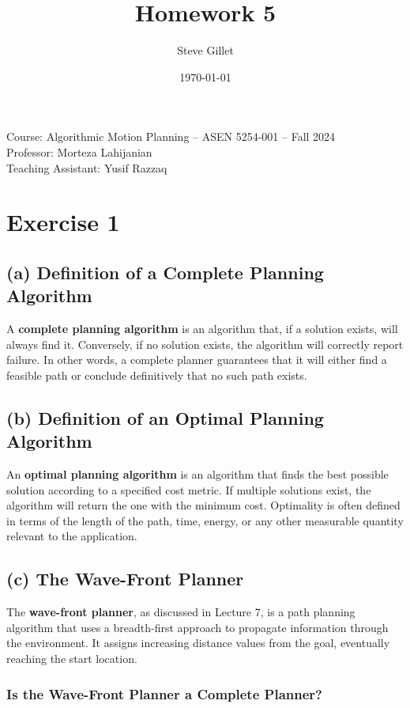 \documentclass{article}
\title{Homework 5}
\author{Steve Gillet}
\date{\today}
\newcommand{\className}{Course: Algorithmic Motion Planning – ASEN 5254-001 – Fall 2024}
\newcommand{\professorName}{Professor: Morteza Lahijanian}
\newcommand{\taName}{Teaching Assistant: Yusif Razzaq}
\begin{document}
\maketitle
\begin{center}
    \large{\className} \\
    \large{\professorName} \\
    \large{\taName}
\end{center}

\section{Exercise 1}

\subsection*{(a) Definition of a Complete Planning Algorithm}

A \textbf{complete planning algorithm} is an algorithm that, if a solution exists, will always find it. Conversely, if no solution exists, the algorithm will correctly report failure. In other words, a complete planner guarantees that it will either find a feasible path or conclude definitively that no such path exists.

\subsection*{(b) Definition of an Optimal Planning Algorithm}

An \textbf{optimal planning algorithm} is an algorithm that finds the best possible solution according to a specified cost metric. If multiple solutions exist, the algorithm will return the one with the minimum cost. Optimality is often defined in terms of the length of the path, time, energy, or any other measurable quantity relevant to the application.

\subsection*{(c) The Wave-Front Planner}

The \textbf{wave-front planner}, as discussed in Lecture 7, is a path planning algorithm that uses a breadth-first approach to propagate information through the environment. It assigns increasing distance values from the goal, eventually reaching the start location.

\subsubsection*{Is the Wave-Front Planner a Complete Planner?}
\end{document}
